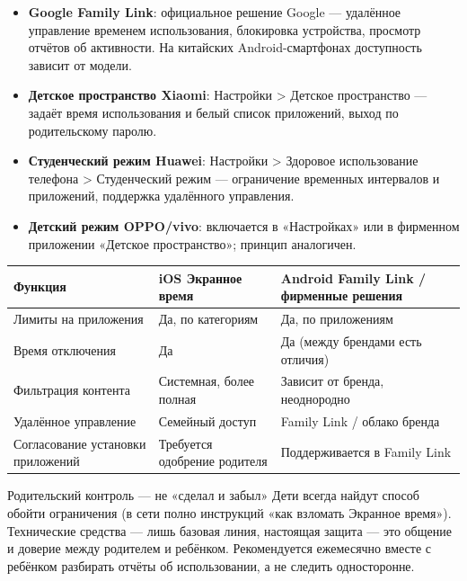 
\begin{itemize}
  \item \textbf{Google Family Link}: официальное решение Google — удалённое управление временем использования, блокировка устройства, просмотр отчётов об активности. На китайских Android-смартфонах доступность зависит от модели.
  \item \textbf{Детское пространство Xiaomi}: Настройки > Детское пространство — задаёт время использования и белый список приложений, выход по родительскому паролю.
  \item \textbf{Студенческий режим Huawei}: Настройки > Здоровое использование телефона > Студенческий режим — ограничение временных интервалов и приложений, поддержка удалённого управления.
  \item \textbf{Детский режим OPPO/vivo}: включается в «Настройках» или в фирменном приложении «Детское пространство»; принцип аналогичен.
\end{itemize}

\begin{center}
\begin{tabularx}{\linewidth}{|X|X|X|}
\hline
\textbf{Функция} & \textbf{iOS Экранное время} & \textbf{Android Family Link / фирменные решения} \tabularnewline
\hline
Лимиты на приложения & Да, по категориям & Да, по приложениям \tabularnewline
Время отключения & Да & Да (между брендами есть отличия) \tabularnewline
Фильтрация контента & Системная, более полная & Зависит от бренда, неоднородно \tabularnewline
Удалённое управление & Семейный доступ & Family Link / облако бренда \tabularnewline
Согласование установки приложений & Требуется одобрение родителя & Поддерживается в Family Link \tabularnewline
\hline
\end{tabularx}
\end{center}

\begin{tcbwarn}{Родительский контроль — не «сделал и забыл»}
Дети всегда найдут способ обойти ограничения (в сети полно инструкций «как взломать Экранное время»). Технические средства — лишь базовая линия, настоящая защита — это общение и доверие между родителем и ребёнком. Рекомендуется ежемесячно вместе с ребёнком разбирать отчёты об использовании, а не следить односторонне.

\end{tcbwarn}


